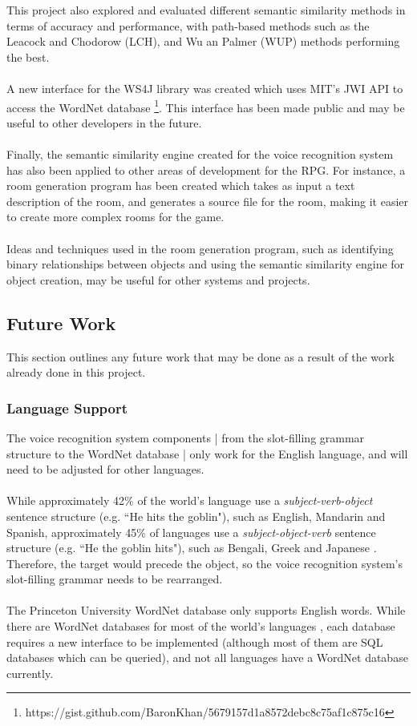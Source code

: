 \documentclass[11pt]{article}
\begin{document}
This project also explored and evaluated different semantic similarity methods in terms of accuracy and performance, with path-based methods such as the Leacock and Chodorow (LCH), and Wu an Palmer (WUP) methods performing the best.
\\
\\
A new interface for the WS4J library was created which uses MIT's JWI API to access the WordNet database \footnote{https://gist.github.com/BaronKhan/5679157d1a8572debc8c75af1c875c16}. This interface has been made public and may be useful to other developers in the future.
\\
\\
Finally, the semantic similarity engine created for the voice recognition system has also been applied to other areas of development for the RPG. For instance, a room generation program has been created which takes as input a text description of the room, and generates a source file for the room, making it easier to create more complex rooms for the game.
\\
\\
Ideas and techniques used in the room generation program, such as identifying binary relationships between objects and using the semantic similarity engine for object creation, may be useful for other systems and projects.

\subsection{Future Work}

This section outlines any future work that may be done as a result of the work already done in this project.

\subsubsection{Language Support}

The voice recognition system components | from the slot-filling grammar structure to the WordNet database | only work for the English language, and will need to be adjusted for other languages.
\\
\\
While approximately 42\% of the world's language use a \textit{subject-verb-object} sentence structure (e.g. ``He hits the goblin"), such as English, Mandarin and Spanish, approximately 45\% of languages use a \textit{subject-object-verb} sentence structure (e.g. ``He the goblin hits"), such as Bengali, Greek and Japanese \cite{RefWorks:130}. Therefore, the target would precede the object, so the voice recognition system's slot-filling grammar needs to be rearranged.
\\
\\
The Princeton University WordNet database only supports English words. While there are WordNet databases for most of the world's languages \cite{RefWorks:131}, each database requires a new interface to be implemented (although most of them are SQL databases which can be queried), and not all languages have a WordNet database currently.
\end{document}
